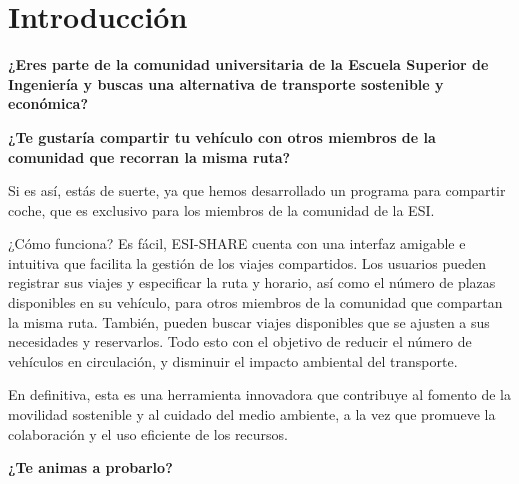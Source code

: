

\section{Introducción}

\begin{center}
    \textbf{¿Eres parte de la comunidad universitaria de la Escuela Superior de Ingeniería y buscas una alternativa de transporte sostenible y económica?}\\
\end{center}
\begin{center}
    \textbf{¿Te gustaría compartir tu vehículo con otros miembros de la comunidad que recorran la misma ruta?}\\
\end{center}
Si es así, estás de suerte, ya que hemos desarrollado un programa para compartir coche, que es exclusivo para los miembros de la comunidad de la ESI.

\bigskip

¿Cómo funciona? Es fácil, ESI-SHARE cuenta con una interfaz amigable e intuitiva que facilita la gestión de los viajes compartidos.  Los usuarios pueden registrar sus
viajes y especificar la ruta y horario, así como el número de plazas disponibles en su vehículo, para otros miembros de la comunidad que compartan la misma ruta.
También, pueden buscar viajes disponibles que se ajusten a sus necesidades y reservarlos. Todo esto con el objetivo de reducir el número de vehículos en circulación,
y disminuir el impacto ambiental del transporte.

\bigskip

En definitiva, esta es una herramienta innovadora que contribuye al fomento de la movilidad sostenible y al cuidado del medio ambiente, a la vez que
promueve la colaboración y el uso eficiente de los recursos.
\bigskip
\begin{center}
    \textbf{¿Te animas a probarlo?}
\end{center}